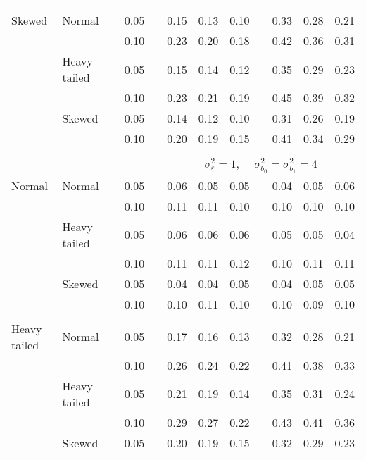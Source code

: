 \begin{table}[ht]
\begin{scriptsize}
\begin{center}
\begin{tabular}{ll p{.1cm} c p{.1cm} rrr p{.1cm} rrr}
             &&&&&&&&&&&\\
Skewed       & Normal       && 0.05 &&  0.15 & 0.13 & 0.10 && 0.33 & 0.28 & 0.21 \\ 
             &              && 0.10 &&  0.23 & 0.20 & 0.18 && 0.42 & 0.36 & 0.31 \\ 
             & Heavy tailed && 0.05 &&  0.15 & 0.14 & 0.12 && 0.35 & 0.29 & 0.23 \\ 
             &              && 0.10 &&  0.23 & 0.21 & 0.19 && 0.45 & 0.39 & 0.32 \\ 
             & Skewed       && 0.05 &&  0.14 & 0.12 & 0.10 && 0.31 & 0.26 & 0.19 \\ 
             &              && 0.10 &&  0.20 & 0.19 & 0.15 && 0.41 & 0.34 & 0.29 \\ 


&&&&&&&&&&&\\
& && && \multicolumn{7}{c}{$\sigma_{\varepsilon}^2 = 1$, \ \ $\sigma_{b_0}^2 = \sigma_{b_1}^2 = 4$} \\ \cline{6-12}
\rowcolor{gray!20}Normal       & Normal       && 0.05 &&  0.06 & 0.05 & 0.05 && 0.04 & 0.05 & 0.06 \\ 
\rowcolor{gray!20}             &              && 0.10 &&  0.11 & 0.11 & 0.10 && 0.10 & 0.10 & 0.10 \\ 
\rowcolor{gray!20}             & Heavy tailed && 0.05 &&  0.06 & 0.06 & 0.06 && 0.05 & 0.05 & 0.04 \\ 
\rowcolor{gray!20}             &              && 0.10 &&  0.11 & 0.11 & 0.12 && 0.10 & 0.11 & 0.11 \\ 
\rowcolor{gray!20}             & Skewed       && 0.05 &&  0.04 & 0.04 & 0.05 && 0.04 & 0.05 & 0.05 \\ 
\rowcolor{gray!20}             &              && 0.10 &&  0.10 & 0.11 & 0.10 && 0.10 & 0.09 & 0.10 \\ 
             &&&&&&&&&&&\\
Heavy tailed & Normal       && 0.05 &&  0.17 & 0.16 & 0.13 && 0.32 & 0.28 & 0.21 \\ 
             &              && 0.10 &&  0.26 & 0.24 & 0.22 && 0.41 & 0.38 & 0.33 \\ 
             & Heavy tailed && 0.05 &&  0.21 & 0.19 & 0.14 && 0.35 & 0.31 & 0.24 \\ 
             &              && 0.10 &&  0.29 & 0.27 & 0.22 && 0.43 & 0.41 & 0.36 \\ 
             & Skewed       && 0.05 &&  0.20 & 0.19 & 0.15 && 0.32 & 0.29 & 0.23 \\ 

\end{tabular}
\end{center}
\end{scriptsize}
\end{table}
